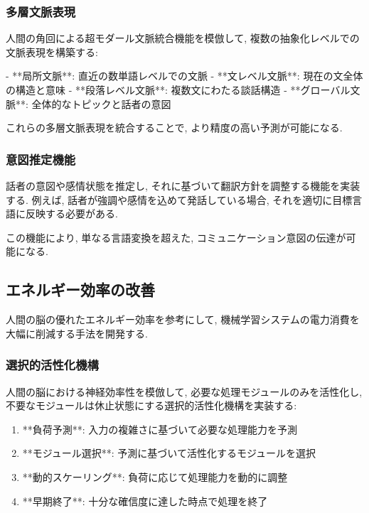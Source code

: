 \subsubsection{多層文脈表現}

人間の角回による超モダール文脈統合機能を模倣して, 複数の抽象化レベルでの文脈表現を構築する:

- **局所文脈**: 直近の数単語レベルでの文脈
- **文レベル文脈**: 現在の文全体の構造と意味
- **段落レベル文脈**: 複数文にわたる談話構造
- **グローバル文脈**: 全体的なトピックと話者の意図

これらの多層文脈表現を統合することで, より精度の高い予測が可能になる.

\subsubsection{意図推定機能}

話者の意図や感情状態を推定し, それに基づいて翻訳方針を調整する機能を実装する.
例えば, 話者が強調や感情を込めて発話している場合, それを適切に目標言語に反映する必要がある.

この機能により, 単なる言語変換を超えた, コミュニケーション意図の伝達が可能になる.

\subsection{エネルギー効率の改善}

人間の脳の優れたエネルギー効率を参考にして, 機械学習システムの電力消費を大幅に削減する手法を開発する.

\subsubsection{選択的活性化機構}

人間の脳における神経効率性を模倣して, 必要な処理モジュールのみを活性化し, 不要なモジュールは休止状態にする選択的活性化機構を実装する:

\begin{enumerate}
\item **負荷予測**: 入力の複雑さに基づいて必要な処理能力を予測
\item **モジュール選択**: 予測に基づいて活性化するモジュールを選択
\item **動的スケーリング**: 負荷に応じて処理能力を動的に調整
\item **早期終了**: 十分な確信度に達した時点で処理を終了
\end{enumerate}

